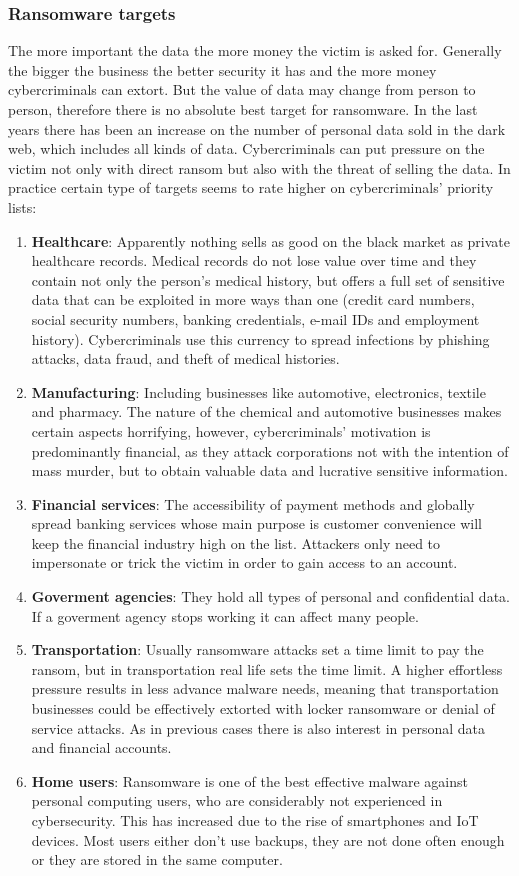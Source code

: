 \subsubsection{Ransomware targets}
The more important the data the more money the victim is asked for.
Generally the bigger the business the better security it has and the more money cybercriminals can extort.
\linej
But the value of data may change from person to person, therefore there is no absolute best target for ransomware.
In the last years there has been an increase on the number of personal data sold in the dark web, which includes all kinds of data.
Cybercriminals can put pressure on the victim not only with direct ransom but also with the threat of selling the data.
\linej
In practice certain type of targets seems to rate higher on cybercriminals' priority lists\cite{ransomware_digital_extortion}:
\begin{enumerate}
	\item \textbf{Healthcare}: Apparently nothing sells as good on the black market as private healthcare records.
		Medical records do not lose value over time and they contain not only the person's medical history, but offers a full set of sensitive data that can be exploited in more ways than one (credit card numbers, social security numbers, banking credentials, e-mail IDs and employment history).
Cybercriminals use this currency to spread infections by phishing attacks, data fraud, and theft of medical histories.
	\item \textbf{Manufacturing}: Including businesses like automotive, electronics, textile and pharmacy.
The nature of the chemical and automotive businesses makes certain aspects horrifying, however, cybercriminals' motivation is predominantly financial, as they attack corporations not with the intention of mass murder, but to obtain valuable data and lucrative sensitive information.
	\item \textbf{Financial services}: The accessibility of payment methods and globally spread banking services whose main purpose is customer convenience will keep the financial industry high on the list. Attackers only need to impersonate or trick the victim in order to gain access to an account.
	\item \textbf{Goverment agencies}: They hold all types of personal and confidential data. If a goverment agency stops working it can affect many people.
	\item \textbf{Transportation}: Usually ransomware attacks set a time limit to pay the ransom, but in transportation real life sets the time limit. A higher effortless pressure results in less advance malware needs, meaning that transportation businesses could be effectively extorted with locker ransomware or denial of service attacks.
As in previous cases there is also interest in personal data and financial accounts.
	\item \textbf{Home users}: Ransomware is one of the best effective malware against personal computing users, who are considerably not experienced in cybersecurity.
This has increased due to the rise of smartphones and IoT devices.
Most users either don't use backups, they are not done often enough or they are stored in the same computer.
\end{enumerate}
